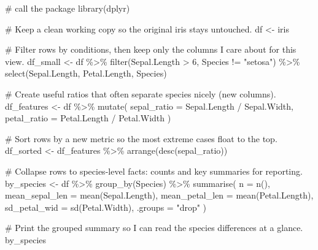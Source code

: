 \documentclass[
  letterpaper,
  DIV=11,
  numbers=noendperiod]{scrreprt}
\newenvironment{Shaded}{\begin{snugshade}}{\end{snugshade}}
\newcommand{\AttributeTok}[1]{\textcolor[rgb]{0.40,0.45,0.13}{#1}}
\newcommand{\CommentTok}[1]{\textcolor[rgb]{0.37,0.37,0.37}{#1}}
\newcommand{\DecValTok}[1]{\textcolor[rgb]{0.68,0.00,0.00}{#1}}
\newcommand{\FunctionTok}[1]{\textcolor[rgb]{0.28,0.35,0.67}{#1}}
\newcommand{\NormalTok}[1]{\textcolor[rgb]{0.00,0.23,0.31}{#1}}
\newcommand{\OtherTok}[1]{\textcolor[rgb]{0.00,0.23,0.31}{#1}}
\newcommand{\SpecialCharTok}[1]{\textcolor[rgb]{0.37,0.37,0.37}{#1}}
\newcommand{\StringTok}[1]{\textcolor[rgb]{0.13,0.47,0.30}{#1}}
\begin{document}
\begin{Shaded}
\begin{Highlighting}[]
\CommentTok{\# call the package }
\FunctionTok{library}\NormalTok{(dplyr)}

\CommentTok{\# Keep a clean working copy so the original iris stays untouched.}
\NormalTok{df }\OtherTok{\textless{}{-}}\NormalTok{ iris}

\CommentTok{\# Filter rows by conditions, then keep only the columns I care about for this view.}
\NormalTok{df\_small }\OtherTok{\textless{}{-}}\NormalTok{ df }\SpecialCharTok{\%\textgreater{}\%}
  \FunctionTok{filter}\NormalTok{(Sepal.Length }\SpecialCharTok{\textgreater{}} \DecValTok{6}\NormalTok{, Species }\SpecialCharTok{!=} \StringTok{"setosa"}\NormalTok{) }\SpecialCharTok{\%\textgreater{}\%}
  \FunctionTok{select}\NormalTok{(Sepal.Length, Petal.Length, Species)}

\CommentTok{\# Create useful ratios that often separate species nicely (new columns).}
\NormalTok{df\_features }\OtherTok{\textless{}{-}}\NormalTok{ df }\SpecialCharTok{\%\textgreater{}\%}
  \FunctionTok{mutate}\NormalTok{(}
    \AttributeTok{sepal\_ratio =}\NormalTok{ Sepal.Length }\SpecialCharTok{/}\NormalTok{ Sepal.Width,}
    \AttributeTok{petal\_ratio =}\NormalTok{ Petal.Length }\SpecialCharTok{/}\NormalTok{ Petal.Width}
\NormalTok{  )}

\CommentTok{\# Sort rows by a new metric so the most extreme cases float to the top.}
\NormalTok{df\_sorted }\OtherTok{\textless{}{-}}\NormalTok{ df\_features }\SpecialCharTok{\%\textgreater{}\%}
  \FunctionTok{arrange}\NormalTok{(}\FunctionTok{desc}\NormalTok{(sepal\_ratio))}

\CommentTok{\# Collapse rows to species{-}level facts: counts and key summaries for reporting.}
\NormalTok{by\_species }\OtherTok{\textless{}{-}}\NormalTok{ df }\SpecialCharTok{\%\textgreater{}\%}
  \FunctionTok{group\_by}\NormalTok{(Species) }\SpecialCharTok{\%\textgreater{}\%}
  \FunctionTok{summarise}\NormalTok{(}
    \AttributeTok{n =} \FunctionTok{n}\NormalTok{(),}
    \AttributeTok{mean\_sepal\_len =} \FunctionTok{mean}\NormalTok{(Sepal.Length),}
    \AttributeTok{mean\_petal\_len =} \FunctionTok{mean}\NormalTok{(Petal.Length),}
    \AttributeTok{sd\_petal\_wid   =} \FunctionTok{sd}\NormalTok{(Petal.Width),}
    \AttributeTok{.groups =} \StringTok{"drop"}
\NormalTok{  )}

\CommentTok{\# Print the grouped summary so I can read the species differences at a glance.}
\NormalTok{by\_species}
\end{Highlighting}
\end{Shaded}
\end{document}
